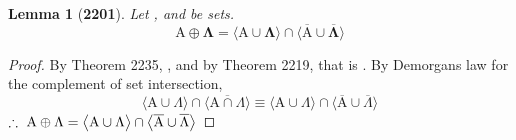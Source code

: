 \documentclass[preview]{standalone}
\newtheorem*{lemma*}{Lemma}
\begin{document}
\begin{lemma*}[\textbf{2201}] \color{black}
    Let , and \bm{$\Lambda$} be sets.
    \begin{equation*}
        \bm{
            \mathrm{A} \oplus \Lambda
                =
            \Big \langle \mathrm{A} \cup \Lambda \Big \rangle
                \cap
            \Big \langle 
                \overline{\mathrm{A}} 
                    \cup 
                \overline{\Lambda} 
            \Big \rangle
        }
    \end{equation*}
\end{lemma*}
\begin{proof} \color{black}
    By Theorem 2235,
    , 
    and by Theorem 2219, that is
    .
    By Demorgans law for the complement of set intersection,
    \begin{equation*}
        \Big \langle \mathrm{A} \cup \Lambda \Big \rangle
            \cap
        \Big \langle \overline{\mathrm{A} \cap \Lambda} \Big \rangle
            \equiv
        \Big \langle \mathrm{A} \cup \Lambda \Big \rangle
            \cap
        \Big \langle \overline{\mathrm{A}} \cup \overline{\Lambda} \Big \rangle
    \end{equation*}
    $\therefore \text{\space} \relax{
    \mathrm{A} \oplus \Lambda
        =
    \big \langle \mathrm{A} \cup \Lambda \big \rangle
        \cap
    \big \langle 
        \overline{\mathrm{A}} 
            \cup 
        \overline{\Lambda} 
    \big \rangle}$
\color{lightgray} \end{proof}
\end{document}
